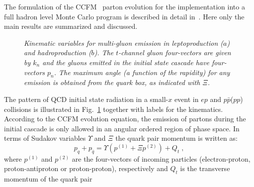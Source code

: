 \documentclass[11pt]{article} \usepackage{mystyle-new}
\newcommand{\CCFM}{CCFMa,CCFMb,Catani:1989sg,CCFMd}
\begin{document}
The formulation of the CCFM~\cite{\CCFM} parton evolution 
for the implementation into a full hadron level Monte Carlo program is
described in detail
in~\cite{CASCADE,jung_salam_2000}.  Here only 
the main results are summarized and discussed.
\begin{figure}[th]
\centerline{} 
\vspace*{8pt}
\caption{\it Kinematic variables for multi-gluon emission in leptoproduction ($a$)
and hadroproduction ($b$). 
The $t$-channel gluon
four-vectors are given by $k_n$ and the gluons emitted in the initial state
cascade have four-vectors $p_n$. The maximum
angle (a function of the rapidity) for any emission is obtained
from the quark box, as indicated with $\Xi$.
\label{CCFM_variables} } 
\end{figure}
The pattern of QCD initial state
radiation in a small-$x$ event in $ep$ and $p \bar{p}$($pp$)  collisions
 is illustrated in
Fig.~\ref{CCFM_variables}  together with labels for the
kinematics.  According to the CCFM evolution equation, the emission of
partons during the initial cascade is only allowed in an
angular ordered region of phase space. 
 In terms
of Sudakov variables $\Upsilon$ and $\Xi$  the quark pair momentum is written as:
\begin{equation}
p_q + p_{\bar{q}} = \Upsilon (p^{(1)} + \Xi p^{(2)}) + Q_t \;,
\end{equation}
where $p^{(1)}$ and $p^{(2)}$ are the four-vectors of
 incoming particles (electron-proton, proton-antiproton or proton-proton), 
respectively and $Q_t$ is the transverse momentum of the quark pair
\end{document}
